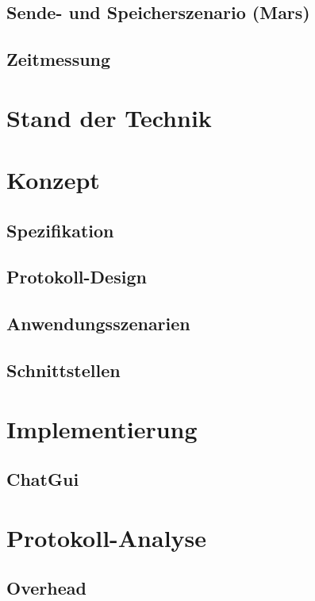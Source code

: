 \documentclass[
    11pt, %
    DIV=11,
    ngerman, %
    a4paper, %
    twoside, %
    titlepage, %
    parskip=half, %
    headings=normal, %
    listof=totoc, %
    bibliography=totoc, %
    index=totoc, %
    captions=tableheading, %
    final %
]{scrreprt}
\begin{document}
	\section{Sende- und Speicherszenario (Mars)}
		
	\section{Zeitmessung}
		

\chapter{Stand der Technik}
  

\chapter{Konzept}
	
	\section{Spezifikation}
		
	\newpage
	\section{Protokoll-Design}
		
	\section{Anwendungsszenarien}
		
	\section{Schnittstellen}
		

\chapter{Implementierung}
	
	\section{ChatGui}
		

\chapter{Protokoll-Analyse}
	
	\section{Overhead}
		
\end{document}
